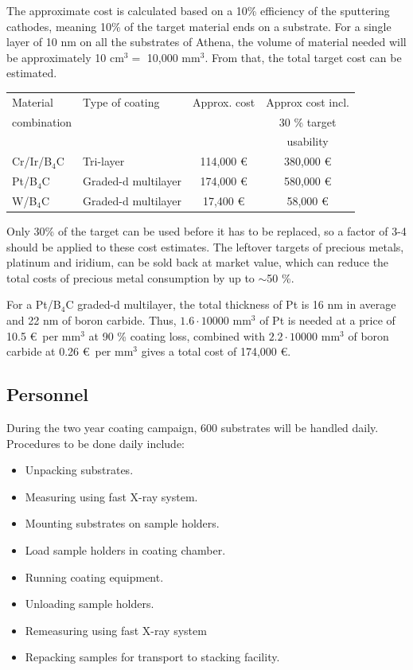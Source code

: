 The approximate cost is calculated based on a 10\% efficiency of the sputtering cathodes, meaning 10\% of the target material ends on a substrate. For a single layer of 10 nm on all the substrates of Athena, the volume of material needed will be approximately 10 cm$^3 = $ 10,000 mm$^3$. From that, the total target cost can be estimated.

\begin{table}[htbp]
	\centering
\begin{tabular}{l|l|c|c}
Material 	& Type of coating & Approx. cost & Approx cost incl. \\
combination	&	&	&	30 \% target \\
&	&	&	usability\\
\hline
\hline
Cr/Ir/B$_4$C & Tri-layer & 114,000 \euro & 380,000 \euro \\
\hline
Pt/B$_4$C & Graded-d multilayer & 174,000 \euro & 580,000 \euro\\
\hline
W/B$_4$C & Graded-d multilayer & 17,400 \euro & 58,000 \euro \\
\end{tabular}
\end{table}

Only 30\% of the target can be used before it has to be replaced, so a factor of 3-4 should be applied to these cost estimates. The leftover targets of precious metals, platinum and iridium, can be sold back at market value, which can reduce the total costs of precious metal consumption by up to $\sim$50 \%.

For a Pt/B$_4$C graded-d multilayer, the total thickness of Pt is 16 nm in average and 22 nm of boron carbide. Thus, $1.6 \cdot 10000$ mm$^3$ of Pt is needed at a price of 10.5 \euro\ per mm$^3$ at 90 \% coating loss, combined with $2.2 \cdot 10000$ mm$^3$ of boron carbide at 0.26 \euro\ per mm$^3$ gives a total cost of 174,000 \euro.

\subsection{Personnel}
During the two year coating campaign, 600 substrates will be handled daily. Procedures to be done daily include:

\begin{itemize}[itemsep=1.5pt,parsep=1pt]
	\item Unpacking substrates.
	\item Measuring using fast X-ray system.
	\item Mounting substrates on sample holders.
	\item Load sample holders in coating chamber.
	\item Running coating equipment.
	\item Unloading sample holders.
	\item Remeasuring using fast X-ray system
	\item Repacking samples for transport to stacking facility.
\end{itemize}

